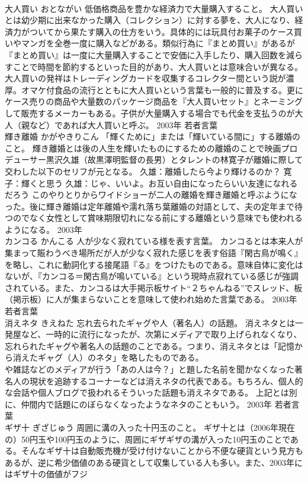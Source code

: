 \documentclass[8pt]{extreport}
\begin{document}
\begin{CJK}{UTF8}{min}
\\	大人買い	おとながい	低価格商品を豊かな経済力で大量購入すること。	大人買いとは幼少期に出来なかった購入（コレクション）に対する夢を、大人になり、経済力がついてから果たす購入の仕方をいう。具体的には玩具付お菓子のケース買いやマンガを全巻一度に購入などがある。類似行為に『まとめ買い』があるが『まとめ買い』は一度に大量購入することで安価に入手したり、購入回数を減らすことで時間を節約するといった目的があり、大人買いとは意味合いが異なる。大人買いの発祥はトレーディングカードを収集するコレクター間という説が濃厚。オマケ付食品の流行とともに大人買いという言葉も一般的に普及する。更にケース売りの商品や大量数のパッケージ商品を『大人買いセット』とネーミングして販売するメーカーもある。子供が大量購入する場合でも代金を支払うのが大人（親など）であれば大人買いと呼ぶ。	2003年	若者言葉	
\\	輝き離婚	かがやきりこん	「輝くために」または「輝いている間に」する離婚のこと。	輝き離婚とは後の人生を輝いたものにするための離婚のことで映画プロデューサー黒沢久雄（故黒澤明監督の長男）とタレントの林寛子が離婚に際して交わした以下のセリフが元となる。 久雄：離婚したら今より輝けるのか？ 寛子：輝くと思う 久雄：じゃ、いいよ。お互い自由になったらいい友達になれるだろう このやりとりからワイドショーが二人の離婚を輝き離婚と呼ぶようになった。後に輝き離婚は定年離婚や濡れ落ち葉離婚の対語として、夫の定年まで待つのでなく女性として賞味期限切れになる前にする離婚という意味でも使われるようになる。	2003年	
\\	カンコる	かんこる	人が少なく寂れている様を表す言葉。	カンコるとは本来人が集まって賑わうべき場所だが人が少なく寂れた感じを表す俗語『閑古鳥が鳴く』を略し、これに動詞化する接尾語『る』をつけたものである。意味自体に変化はないが、『カンコる＝閑古鳥が鳴いている』という現時点寂れている感じが強調されている。また、カンコるは大手掲示板サイト“２ちゃんねる”でスレッド、板（掲示板）に人が集まらないことを意味して使われ始めた言葉である。	2003年	若者言葉	
\\	消えネタ	きえねた	忘れ去られたギャグや人（著名人）の話題。	消えネタとは一発屋など、一時的に流行になったが、次第にメディアで取り上げられなくなり、忘れられたギャグや著名人の話題のことである。つまり、消えネタとは「記憶から消えたギャグ（人）のネタ」を略したものである。
\\	や雑誌などのメディアが行う「あの人は今？」と題した名前を聞かなくなった著名人の現状を追跡するコーナーなどは消えネタの代表である。もちろん、個人的な会話や個人ブログで扱われるそういった話題も消えネタである。 上記とは別に、仲間内で話題にのぼらなくなったようなネタのこともいう。	2003年	若者言葉	
\\	ギザ十	ぎざじゅう	周囲に溝の入った十円玉のこと。	ギザ十とは（2006年現在の）50円玉や100円玉のように、周囲にギザギザの溝が入った10円玉のことである。そんなギザ十は自動販売機が受け付けないことから不便な硬貨という見方もあるが、逆に希少価値のある硬貨として収集している人も多い。また、2003年にはギザ十の価値がフジ

\end{CJK}
\end{document}
